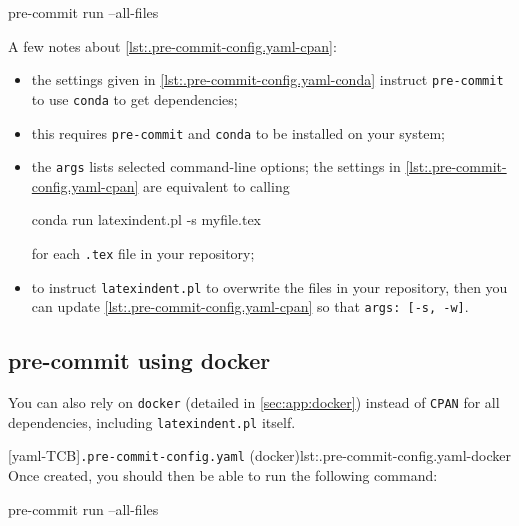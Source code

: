   \begin{commandshell}
pre-commit run --all-files  
\end{commandshell}

  A few notes about \cref{lst:.pre-commit-config.yaml-cpan}:
  \begin{itemize}
   \item the settings given in \cref{lst:.pre-commit-config.yaml-conda} instruct
         \texttt{pre-commit} to use \texttt{conda} to get dependencies;
   \item this requires \texttt{pre-commit} and \texttt{conda} to be installed on your
         system;
   \item the \texttt{args} lists selected command-line options; the settings in
         \cref{lst:.pre-commit-config.yaml-cpan} are equivalent to calling

         \begin{commandshell}
conda run latexindent.pl -s myfile.tex       
\end{commandshell}

         for each \texttt{.tex} file in your repository;
   \item to instruct \texttt{latexindent.pl} to overwrite the files in your repository,
         then you can update \cref{lst:.pre-commit-config.yaml-cpan} so that
         \texttt{args: [-s, -w]}.
  \end{itemize}

 \subsection{pre-commit using docker}\label{sec:pre-commit-docker}

  You can also rely on \texttt{docker} (detailed in \cref{sec:app:docker}) instead of
  \texttt{CPAN} for all dependencies, including \texttt{latexindent.pl} itself.
    

  [yaml-TCB]{\texttt{.pre-commit-config.yaml} (docker)}{lst:.pre-commit-config.yaml-docker}
  Once created, you should then be able to run the following command:

  \begin{commandshell}
pre-commit run --all-files
\end{commandshell}


